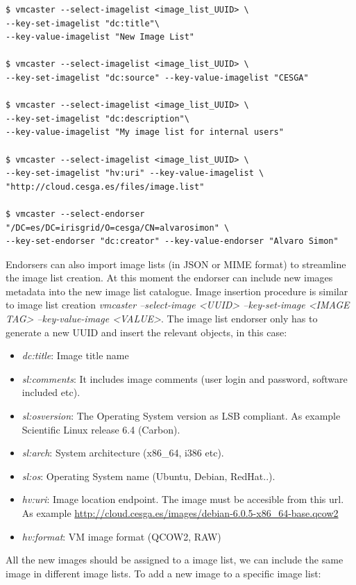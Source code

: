 \documentclass[oribibl]{llncs_Ibergrid2013}
\begin{document}
\begin{verbatim}
$ vmcaster --select-imagelist <image_list_UUID> \
--key-set-imagelist "dc:title"\ 
--key-value-imagelist "New Image List"

$ vmcaster --select-imagelist <image_list_UUID> \ 
--key-set-imagelist "dc:source" --key-value-imagelist "CESGA"

$ vmcaster --select-imagelist <image_list_UUID> \ 
--key-set-imagelist "dc:description"\ 
--key-value-imagelist "My image list for internal users"

$ vmcaster --select-imagelist <image_list_UUID> \ 
--key-set-imagelist "hv:uri" --key-value-imagelist \ 
"http://cloud.cesga.es/files/image.list"

$ vmcaster --select-endorser "/DC=es/DC=irisgrid/O=cesga/CN=alvarosimon" \
--key-set-endorser "dc:creator" --key-value-endorser "Alvaro Simon"
\end{verbatim}

Endorsers can also import image lists (in JSON or MIME format) to streamline the image list creation. At this moment the endorser can include new images metadata into the new image list catalogue.
Image insertion procedure is similar to image list creation \textit{vmcaster --select-image <UUID> --key-set-image <IMAGE TAG> --key-value-image <VALUE>}.  
The image list endorser only has to generate a new UUID and insert the relevant objects, in this case:
\begin{itemize}
 \item \textit{dc:title}: Image title name
 \item \textit{sl:comments}: It includes image comments (user login and password, software included etc).
 \item \textit{sl:osversion}: The Operating System version as LSB compliant. As example Scientific Linux release 6.4 (Carbon).
 \item \textit{sl:arch}: System architecture (x86\_64, i386 etc).
 \item \textit{sl:os}: Operating System name (Ubuntu, Debian, RedHat..).
 \item \textit{hv:uri}: Image location endpoint. The image must be accesible from this url. As example \url{http://cloud.cesga.es/images/debian-6.0.5-x86_64-base.qcow2}
 \item \textit{hv:format}: VM image format (QCOW2, RAW)
\end{itemize}
All the new images should be assigned to a image list, we can include the same image in different image lists. To add a new image to a specific image list:
\end{document}
